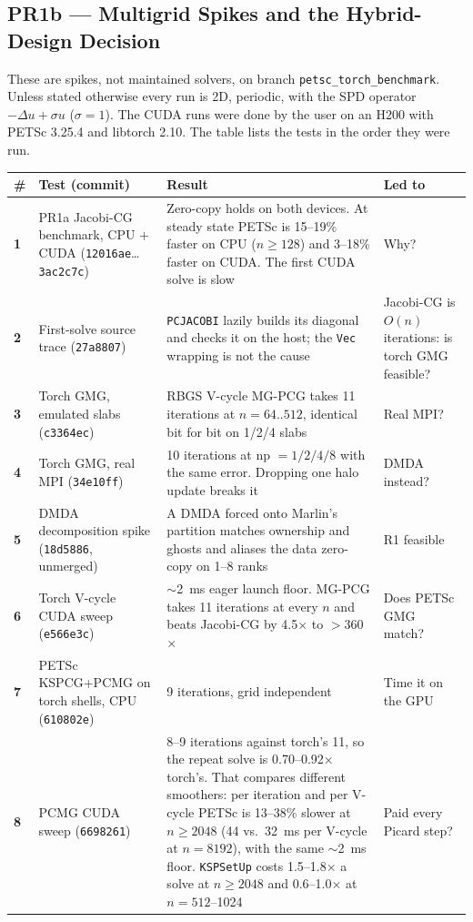 \documentclass[11pt]{article}
\newcommand{\pr}[2]{\subsection{PR#1 --- #2}}
\begin{document}
\pr{1b}{Multigrid Spikes and the Hybrid-Design Decision}
\label{sec:pr1b}
These are spikes, not maintained solvers, on branch \texttt{petsc\_torch\_benchmark}.
Unless stated otherwise every run is 2D, periodic, with the SPD operator
$-\Delta u + \sigma u$ ($\sigma = 1$). The CUDA runs were done by the user on an
H200 with PETSc 3.25.4 and libtorch 2.10. The table lists the tests in the
order they were run.

\begin{longtable}{>{\bfseries}p{} p{} p{} p{}}
\toprule
\# & Test (commit) & Result & Led to \\
\midrule
\endhead
1 & PR1a Jacobi-CG benchmark, CPU + CUDA (\texttt{12016ae}\ldots\texttt{3ac2c7c}) & Zero-copy holds on both devices. At steady state PETSc is 15--19\% faster on CPU ($n\ge128$) and 3--18\% faster on CUDA. The first CUDA solve is slow & Why? \\
2 & First-solve source trace (\texttt{27a8807}) & \texttt{PCJACOBI} lazily builds its diagonal and checks it on the host; the \texttt{Vec} wrapping is not the cause & Jacobi-CG is $O(n)$ iterations: is torch GMG feasible? \\
3 & Torch GMG, emulated slabs (\texttt{c3364ec}) & RBGS V-cycle MG-PCG takes 11 iterations at $n=64..512$, identical bit for bit on 1/2/4 slabs & Real MPI? \\
4 & Torch GMG, real MPI (\texttt{34e10ff}) & 10 iterations at np $=1/2/4/8$ with the same error. Dropping one halo update breaks it & DMDA instead? \\
5 & DMDA decomposition spike (\texttt{18d5886}, unmerged) & A DMDA forced onto Marlin's partition matches ownership and ghosts and aliases the data zero-copy on 1--8 ranks & R1 feasible \\
6 & Torch V-cycle CUDA sweep (\texttt{e566e3c}) & $\sim$2~ms eager launch floor. MG-PCG takes 11 iterations at every $n$ and beats Jacobi-CG by 4.5$\times$ to $>$360$\times$ & Does PETSc GMG match? \\
7 & PETSc KSPCG+PCMG on torch shells, CPU (\texttt{610802e}) & 9 iterations, grid independent & Time it on the GPU \\
8 & PCMG CUDA sweep (\texttt{6698261}) & 8--9 iterations against torch's 11, so the repeat solve is 0.70--0.92$\times$ torch's. That compares different smoothers: per iteration and per V-cycle PETSc is 13--38\% slower at $n\ge2048$ (44 vs.\ 32~ms per V-cycle at $n=8192$), with the same $\sim$2~ms floor. \texttt{KSPSetUp} costs 1.5--1.8$\times$ a solve at $n\ge2048$ and 0.6--1.0$\times$ at $n=512$--1024 & Paid every Picard step? \\

\end{longtable}
\end{document}
